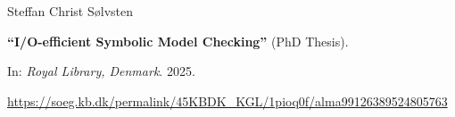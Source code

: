 Steffan Christ Sølvsten

{\bf ``I/O-efficient Symbolic Model Checking''} (PhD Thesis).

In: \emph{Royal Library, Denmark}.
2025.

\medskip

\url{https://soeg.kb.dk/permalink/45KBDK_KGL/1pioq0f/alma99126389524805763}

\label{cite:2025.thesis}